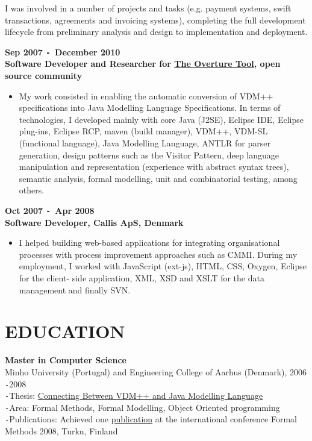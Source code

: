 \documentclass{res}
\def\Minus{\texttt{-}}
\begin{document}
\begin{resume}
\begin{itemize}
        I was involved in a number of projects and tasks (e.g. payment systems, swift transactions, agreements and invoicing systems), completing the full development lifecycle from preliminary analysis and design to implementation and deployment.
       \end{itemize}

  {\bf Sep 2007 \Minus\, December 2010}\\
  {\bf Software Developer and Researcher for \href{http://www.overturetool.org}{The Overture Tool}, open source community}
        \begin{itemize}
        \item[] My work consisted in enabling the automatic conversion of VDM++ specifications into Java Modelling Language Specifications. In terms of technologies, I developed mainly with core Java (J2SE), Eclipse IDE, Eclipse plug-ins, Eclipse RCP, maven (build manager), VDM++, VDM-SL (functional language), Java Modelling Language, ANTLR for parser generation, design patterns such as the Visitor Pattern, deep language manipulation and representation (experience with abstract syntax trees), semantic analysis, formal modelling, unit and combinatorial testing, among others.
       \end{itemize}

  {\bf Oct 2007 \Minus\, Apr 2008}\\
  {\bf Software Developer, Callis ApS, Denmark}
        \begin{itemize}
        \item[] I helped building web-based applications for integrating organisational processes with process improvement approaches such as CMMI.
During my employment, I worked with JavaScript (ext-js), HTML, CSS, Oxygen, Eclipse for the client- side application, XML, XSD and XSLT for the data management and finally SVN.
        \end{itemize}

\section{EDUCATION}
\vspace{0.1in}

    {\bf Master in Computer Science}\\
    Minho University (Portugal) and Engineering College of Aarhus (Denmark), 2006 \Minus 2008\\
    \Minus Thesis: \href{http://wiki.overturetool.org/images/4/44/ConnectingVDMppJML.pdf}{Connecting Between VDM++ and Java Modelling Language}\\
    \Minus Area: Formal Methods, Formal Modelling, Object Oriented programming\\
    \Minus Publications: Achieved one \href{http://www.cs.ncl.ac.uk/publications/trs/papers/1099.pdf}{publication} at the international conference Formal Methods 2008, Turku, Finland


\end{resume}
\end{document}
